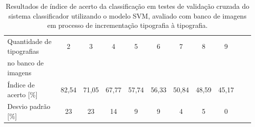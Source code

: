 



\begin{table}[h]
 \centering
 \begin{tabular}{l|c|c|c|c|c|c|c|c|c|c}
    Quantidade de tipografias  & 2 & 3 & 4 & 5 & 6 & 7 & 8 & 9\\ no banco de imagens & & & & & & & & \\
	\hline
	Índice de acerto [\%] & 82,54 & 71,05 & 67,77 & 57,74 & 56,33 & 50,84 & 48,59 & 45,17 \\
	Desvio padrão [\%] & 23 & 23 & 14 & 9 & 9 & 4 & 5 & 0\\
 \end{tabular}
 \caption{Resultados de índice de acerto da classificação em testes de validação cruzada do sistema classificador utilizando o modelo SVM, avaliado com banco de imagens em processo de incrementação tipografia à tipografia.}
 \label{tab:svmResults}
\end{table}

